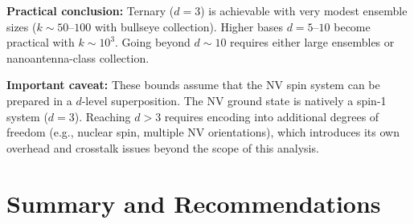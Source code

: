 \documentclass[11pt,letterpaper]{article}
\begin{document}
\textbf{Practical conclusion:} Ternary ($d = 3$) is achievable with very
modest ensemble sizes ($k \sim 50$--$100$ with bullseye collection).  Higher
bases $d = 5$--$10$ become practical with $k \sim 10^3$.  Going beyond
$d \sim 10$ requires either large ensembles or nanoantenna-class collection.

\textbf{Important caveat:} These bounds assume that the NV spin system can
be prepared in a $d$-level superposition.  The NV ground state is natively
a spin-1 system ($d = 3$).  Reaching $d > 3$ requires encoding into additional
degrees of freedom (e.g., nuclear spin, multiple NV orientations), which
introduces its own overhead and crosstalk issues beyond the scope of this
analysis.


\section{Summary and Recommendations}
\label{sec:summary}
\end{document}
